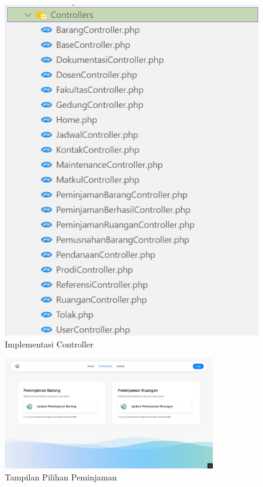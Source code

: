 \begin{figure}
	\centering
	\includegraphics[width=0.82\linewidth]{konten//gambar/implementasi-folder/folder-controller.png}
	\caption{Implementasi Controller}
	\label{fig:implementasi-controller}
\end{figure}

\begin{figure}
	\centering
	\includegraphics[width=0.82\textwidth]{konten/gambar/perbaikan/pilih-peminjaman.jpeg}
	\caption{Tampilan Pilihan Peminjaman}
	\label{fig:pilih-peminjaman}
\end{figure}

